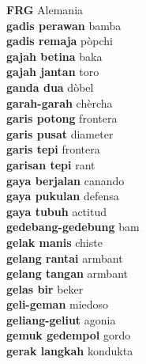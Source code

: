 \textbf{ FRG  } Alemania \\
\textbf{ gadis perawan  } bamba \\
\textbf{ gadis remaja  } pòpchi \\
\textbf{ gajah betina  } baka \\
\textbf{ gajah jantan  } toro \\
\textbf{ ganda dua  } dòbel \\
\textbf{ garah-garah  } chèrcha \\
\textbf{ garis potong  } frontera \\
\textbf{ garis pusat  } diameter \\
\textbf{ garis tepi  } frontera \\
\textbf{ garisan tepi  } rant \\
\textbf{ gaya berjalan  } canando \\
\textbf{ gaya pukulan  } defensa \\
\textbf{ gaya tubuh  } actitud \\
\textbf{ gedebang-gedebung  } bam \\
\textbf{ gelak manis  } chiste \\
\textbf{ gelang rantai  } armbant \\
\textbf{ gelang tangan  } armbant \\
\textbf{ gelas bir  } beker \\
\textbf{ geli-geman  } miedoso \\
\textbf{ geliang-geliut  } agonia \\
\textbf{ gemuk gedempol  } gordo \\
\textbf{ gerak langkah  } kondukta \\
